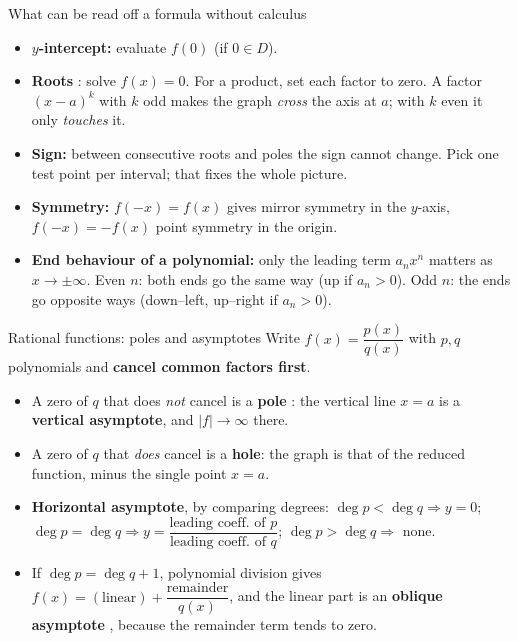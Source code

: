 \begin{rulebox}{What can be read off a formula without calculus}
\begin{itemize}[leftmargin=1.6em,itemsep=0.3ex]
  \item \textbf{$y$-intercept:} evaluate $f(0)$ (if $0\in D$).
  \item \textbf{Roots} : solve $f(x)=0$. For a product,
        set each factor to zero. A factor $(x-a)^{k}$ with $k$ odd makes
        the graph \emph{cross} the axis at $a$; with $k$ even it only
        \emph{touches} it.
  \item \textbf{Sign:} between consecutive roots and poles the sign cannot
        change. Pick one test point per interval; that fixes the whole
        picture.
  \item \textbf{Symmetry:} $f(-x)=f(x)$ gives mirror symmetry in the
        $y$-axis, $f(-x)=-f(x)$ point symmetry in the origin.
  \item \textbf{End behaviour of a polynomial:} only the leading term
        $a_{n}x^{n}$ matters as $x\to\pm\infty$. Even $n$: both ends go the
        same way (up if $a_{n}>0$). Odd $n$: the ends go opposite ways
        (down--left, up--right if $a_{n}>0$).
\end{itemize}
\end{rulebox}

\begin{rulebox}{Rational functions: poles and asymptotes}
Write $f(x)=\dfrac{p(x)}{q(x)}$ with $p,q$ polynomials and
\textbf{cancel common factors first}.
\begin{itemize}[leftmargin=1.6em,itemsep=0.3ex]
  \item A zero of $q$ that does \emph{not} cancel is a \textbf{pole}
        : the vertical line $x=a$ is a
        \textbf{vertical asymptote}, and $|f|\to\infty$ there.
  \item A zero of $q$ that \emph{does} cancel is a \textbf{hole}: the graph
        is that of the reduced function, minus the single point $x=a$.
  \item \textbf{Horizontal asymptote}, by comparing degrees:
        $\deg p<\deg q\Rightarrow y=0$; \;$\deg p=\deg q\Rightarrow
        y=\dfrac{\text{leading coeff. of }p}{\text{leading coeff. of }q}$;
        \;$\deg p>\deg q\Rightarrow$ none.
  \item If $\deg p=\deg q+1$, polynomial division gives
        $f(x)=(\text{linear})+\dfrac{\text{remainder}}{q(x)}$, and the
        linear part is an \textbf{oblique asymptote}
        , because the remainder term tends to zero.
\end{itemize}
\end{rulebox}

